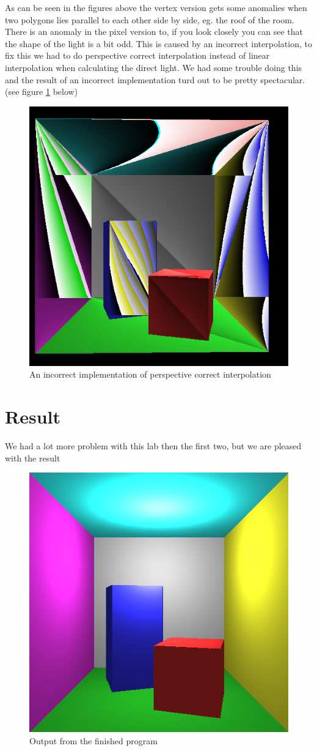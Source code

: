 \documentclass[a4paper,11pt]{article}
\begin{document}
As can be seen in the figures above the vertex version gets some anomalies when two polygons lies parallel to each other side by side, eg. the roof of the room. There is an anomaly in the pixel version to, if you look closely you can see that the shape of the light is a bit odd. This is caused by an incorrect interpolation, to fix this we had to do perspective correct interpolation instead of linear interpolation when calculating the direct light. We had some trouble doing this and the result of an incorrect implementation turd out to be pretty spectacular. (see figure \ref{fun} below)
\begin{figure}[h!]
	\centering
	\includegraphics[width=0.35\linewidth]{fun.png}
	\caption{An incorrect implementation of perspective correct interpolation}
	\label{fun}
\end{figure}
\clearpage
\section{Result}
We had a lot more problem with this lab then the first two, but we are pleased with the result 
\begin{figure}[h!]
	\centering
	\includegraphics[width=0.45\linewidth]{screenshot5.png}
	\caption{Output from the finished program}
	\label{fig5}
\end{figure}
\end{document}
